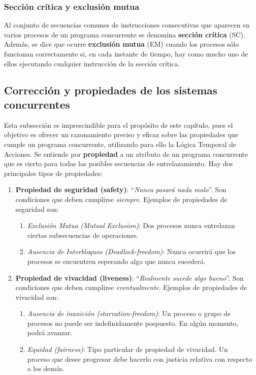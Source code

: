 \subsubsection{Sección crítica y exclusión mutua}\label{subsubsec:concurrentsc}
Al conjunto de secuencias comunes de instrucciones consecutivas que aparecen en varios procesos de un programa concurrente se denomina \textbf{sección crítica} (SC). Además, se dice que ocurre \textbf{exclusión mutua} (EM) cuando los procesos sólo funcionan correctamente si, en cada instante de tiempo, hay como mucho uno de ellos ejecutando cualquier instrucción de la sección crítica.

\subsection{Corrección y propiedades de los sistemas concurrentes}\label{subsec:concurrentproperties}
Esta subsección es imprescindible para el propósito de este capítulo, pues el objetivo es ofrecer un razonamiento preciso y eficaz sobre las propiedades que cumple un programa concurrente, utilizando para ello la Lógica Temporal de Acciones. Se entiende por \textbf{propiedad} a un atributo de un programa concurrente que es cierto para todas las posibles secuencias de entrelazamiento. Hay dos principales tipos de propiedades:

\begin{enumerate}[label=P\arabic*]
    \item \textbf{Propiedad de seguridad (safety)}: ``\textit{Nunca pasará nada malo}''. Son condiciones que deben cumplirse \textit{siempre}. Ejemplos de propiedades de seguridad son:
    \begin{enumerate}[label=P1.\arabic*]
        \item \textit{Exclusión Mutua (Mutual Exclusion)}: Dos procesos nunca entrelazan ciertas subsecuencias de operaciones.
        \item \textit{Ausencia de Interbloqueo (Deadlock-freedom)}: Nunca ocurrirá que los procesos se encuentren esperando algo que nunca sucederá.
    \end{enumerate}
    \item \textbf{Propiedad de vivacidad (liveness)}: ``\textit{Realmente sucede algo bueno}''. Son condiciones que deben cumplirse \textit{eventualmente}. Ejemplos de propiedades de vivacidad son:
    \begin{enumerate}[label=P2.\arabic*]
        \item \textit{Ausencia de inanición (starvation-freedom)}: Un proceso o grupo de procesos no puede ser indefinidamente pospuesto. En algún momento, podrá avanzar.
        \item \textit{Equidad (fairness)}: Tipo particular de propiedad de vivacidad. Un proceso que desee progresar debe hacerlo con justicia relativa con respecto a los demás.
    \end{enumerate}
\end{enumerate}

